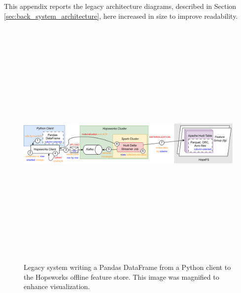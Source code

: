 This appendix reports the legacy architecture diagrams, described in Section \ref{sec:back_system_architecture}, here increased in size to improve readability.

\begin{figure}
    \begin{center}
      \includegraphics[angle=90,origin=c,keepaspectratio,height=12.5cm]{figures/2-background_and_related_work/hudi_write.png}
    \end{center}
    \caption[Legacy system - Write process - Magnified diagram]{Legacy system writing a Pandas DataFrame from a Python client to the Hopsworks offline feature store.  This image was magnified to enhance visualization.}
    \label{fig:appx_hudi_write_schema}
\end{figure}


